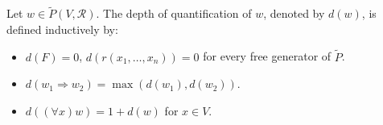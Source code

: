 Let $w \in \tilde{P}(V, \mathcal{R})$. The depth of quantification of $w$, denoted by $d(w)$, is defined inductively by:
\begin{itemize}
\item[(i)] $d(F) = 0$, $d(r(x_1, \ldots, x_n)) = 0$ for every free generator of $\tilde{P}$.
\item[(ii)] $d(w_1 \Rightarrow w_2) = \max(d(w_1), d(w_2))$.
\item[(iii)] $d((\forall x)w) = 1 + d(w)$ for $x \in V$.
\end{itemize}
